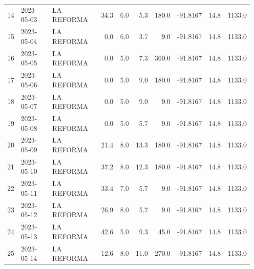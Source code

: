 \documentclass[12pt]{article}
\begin{document}
\begin{center}
\begin{tabular}{lllrrrrrrr}
14  & 2023-05-03 &  LA REFORMA &    34.3 &  6.0 &         5.3 &       180.0 &  -91.8167 &     14.8 &   1133.0 \\
15  & 2023-05-04 &  LA REFORMA &     0.0 &  6.0 &         3.7 &         9.0 &  -91.8167 &     14.8 &   1133.0 \\
16  & 2023-05-05 &  LA REFORMA &     0.0 &  5.0 &         7.3 &       360.0 &  -91.8167 &     14.8 &   1133.0 \\
17  & 2023-05-06 &  LA REFORMA &     0.0 &  5.0 &         9.0 &       180.0 &  -91.8167 &     14.8 &   1133.0 \\
18  & 2023-05-07 &  LA REFORMA &     0.0 &  5.0 &         9.0 &         9.0 &  -91.8167 &     14.8 &   1133.0 \\
19  & 2023-05-08 &  LA REFORMA &     0.0 &  5.0 &         5.7 &         9.0 &  -91.8167 &     14.8 &   1133.0 \\
20  & 2023-05-09 &  LA REFORMA &    21.4 &  8.0 &        13.3 &       180.0 &  -91.8167 &     14.8 &   1133.0 \\
21  & 2023-05-10 &  LA REFORMA &    37.2 &  8.0 &        12.3 &       180.0 &  -91.8167 &     14.8 &   1133.0 \\
22  & 2023-05-11 &  LA REFORMA &    33.4 &  7.0 &         5.7 &         9.0 &  -91.8167 &     14.8 &   1133.0 \\
23  & 2023-05-12 &  LA REFORMA &    26.9 &  8.0 &         5.7 &         9.0 &  -91.8167 &     14.8 &   1133.0 \\
24  & 2023-05-13 &  LA REFORMA &    42.6 &  5.0 &         9.3 &        45.0 &  -91.8167 &     14.8 &   1133.0 \\
25  & 2023-05-14 &  LA REFORMA &    12.6 &  8.0 &        11.0 &       270.0 &  -91.8167 &     14.8 &   1133.0 \\
\bottomrule
\end{tabular}

        
        \end{center}
        
\end{document}
